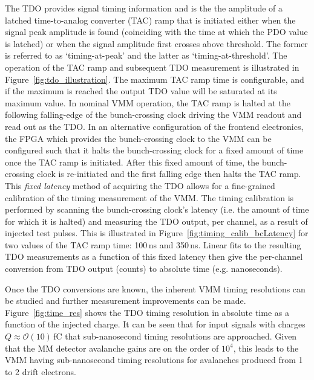 The TDO provides signal timing information and is the the amplitude of a latched
time-to-analog converter (TAC) ramp that is initiated either when the signal peak
amplitude is found (coinciding with the time at which the PDO value is latched)
or when the signal amplitude first crosses above threshold.
The former is referred to as `timing-at-peak' and the latter as `timing-at-threshold'.
The operation of the TAC ramp and subsequent TDO measurement is illustrated
in Figure~\ref{fig:tdo_illustration}.
The maximum TAC ramp time is configurable, and if the maximum is reached the output
TDO value will be saturated at its maximum value.
In nominal VMM operation, the TAC ramp is halted at the following falling-edge
of the bunch-crossing clock driving the VMM readout and read out as the TDO.
In an alternative configuration of the frontend electronics, the FPGA which
provides the bunch-crossing clock to the VMM can be configured such that
it halts the bunch-crossing clock for a fixed amount of time once the TAC ramp is
initiated.
After this fixed amount of time, the bunch-crossing clock is re-initiated and the first
falling edge then halts the TAC ramp.
This \textit{fixed latency} method of acquiring the TDO allows
for a fine-grained calibration of the timing measurement of the VMM.
The timing calibration is performed by scanning the bunch-crossing clock's latency (i.e.
the amount of time for which it is halted) and measuring the TDO output, per channel,
as a result of injected test pulses.
This is illustrated in Figure~\ref{fig:timing_calib_bcLatency} for two values of the
TAC ramp time: 100\,ns and 350\,ns.
Linear fits to the resulting TDO measurements as a function of this fixed latency
then give the per-channel conversion from TDO output (counts) to absolute time (e.g. nanoseconds).

Once the TDO conversions are known, the inherent VMM timing resolutions can be studied and
further measurement improvements can be made.
Figure~\ref{fig:time_res} shows the TDO timing resolution in absolute time as a function
of the injected charge.
It can be seen that for input signals with charges $Q \approx \mathcal{O}(10)$\,fC
that sub-nanosecond timing resolutions are approached.
Given that the MM detector avalanche gains are on the order of $10^4$, this
leads to the VMM having sub-nanosecond timing resolutions for avalanches produced
from 1 to 2 drift electrons.

